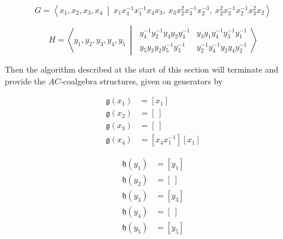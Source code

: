 \documentclass[12pt]{article}
\theoremstyle{definition}
\theoremstyle{theorem}
\begin{document}
\[
  G =
  \left \langle 
  x_1, x_2, x_3, x_4
  \ \middle | \ 
  x_1 x_4^{-1} x_1^{-1} x_4 x_3, \ 
  x_3 x_2^2 x_3^{-1} x_2^{-3}, \ 
  x_2^2 x_3^{-1} x_2^{-1} x_3^2 x_2
  \right \rangle
\]

\[
  H = 
  \left \langle 
  y_1,y_2,y_3,y_4,y_5
  \ \middle | \ 
  \begin{array}{cc}
    y_4^{-1} y_2^{-1} y_4 y_2 y_4^{-1} & y_3 y_1 y_4^{-1} y_3^{-1} y_1^{-1} \\
    y_5 y_3 y_2 y_5^{-1} y_3^{-1} & y_2^{-1} y_4^{-1} y_2 y_4 y_2^{-1}
  \end{array}
  \right \rangle
\]

%
%
% 
%
%
%
%
%
%

Then the algorithm described at the start of this section will terminate and 
provide the $AC$-coalgebra structures, given on generators by

\noindent\begin{minipage}{.5\linewidth}
\begin{align*}
  \mathfrak{g}(x_1) &= [x_1] \\
  \mathfrak{g}(x_2) &= [\ ]  \\
  \mathfrak{g}(x_3) &= [\ ]  \\
  \mathfrak{g}(x_4) &= [x_4 x_1^{-1}][x_1]
\end{align*}
\end{minipage}%
\begin{minipage}{.5\linewidth}  
\begin{align*}
  \mathfrak{h}(y_1) &= [y_1] \\
  \mathfrak{h}(y_2) &= [\ ]  \\
  \mathfrak{h}(y_3) &= [y_3] \\
  \mathfrak{h}(y_4) &= [\ ]  \\
  \mathfrak{h}(y_5) &= [y_5]
\end{align*}
\end{minipage}
\end{document}
